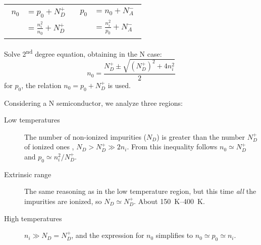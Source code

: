 \documentclass[a4paper,10pt]{article}
\newcommand{\coolsection}[1]{
  \begin{tcolorbox}
      \large\biolinum{\textsc{#1}}
  \end{tcolorbox}
}
\begin{document}
\begin{multicols}{2}
\begin{center}
\begin{tabular}{l|l}
      \parbox{3cm}
      {
      \begin{equation*}
        \begin{split}
          n_0 &= p_0 + N_{\mathit{D}}^+ \\
          &= \frac{n_{\mathit{i}}^2}{n_0} + N_{\mathit{D}}^+
        \end{split}
      \end{equation*}
            }

              &

                \parbox{3cm}
                {
      \begin{equation*}
        \begin{split}
          p_0 &= n_0 + N_{\mathit{A}}^- \\
          &= \frac{n_{\mathit{i}}^2}{p_0} + N_{\mathit{A}}^-
        \end{split}
      \end{equation*}
            }

    \end{tabular}
  \end{center}

  Solve 2\textsuperscript{nd} degree equation, obtaining in the N case:
  \begin{equation*}
    n_0 = \frac{N_{\mathit{D}}^+ \pm \sqrt{(N_{\mathit{D}}^+)^2 + 4n_{\mathit{i}}^2}}{2}
  \end{equation*}
  for $p_0$, the relation $n_0 = p_0 + N_{\mathit{D}}^+$ is used.

  \coolsection{Temperature ranges}
  Considering a N semiconductor, we analyze three regions:
  \begin{description}
  \item[Low temperatures] The number of non-ionized impurities ($N_{\mathit{D}}$)
    is greater than the number $N_{\mathit{D}}^+$ of ionized ones ,
    $N_{\mathit{D}}>N_{\mathit{D}}^+≫2n_{\mathit{i}}$. From this inequality follows $n_0≃N_{\mathit{D}}^+$ and
    $p_0 ≃ n_{\mathit{i}}^2 / N_{\mathit{D}}^+$.
  \item[Extrinsic range] The same reasoning as in the low temperature
    region, but this time \emph{all} the impurities are ionized, so
    $N_{\mathit{D}}≃N_{\mathit{D}}^+$. About \SIrange{150}{400}{\kelvin}.
  \item[High temperatures] $n_{\mathit{i}} ≫ N_{\mathit{D}} = N_{\mathit{D}}^+$, and the expression for
    $n_0$ simplifies to $n_0 ≃ p_0 ≃ n_{\mathit{i}}$.
  \end{description}



\end{multicols}
\end{document}
